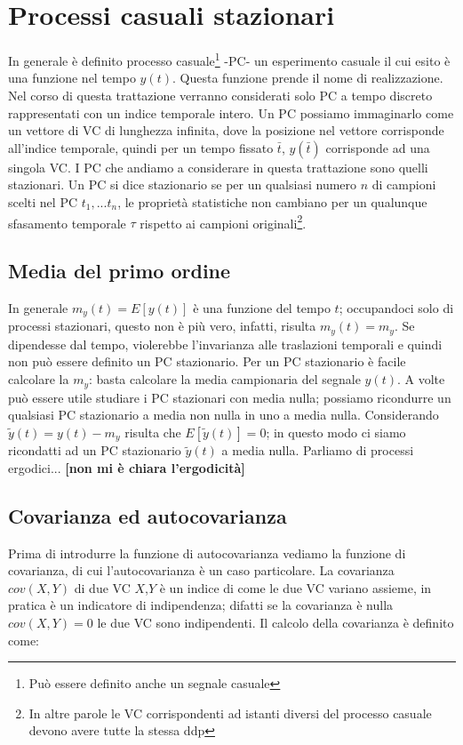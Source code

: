 \section{Processi casuali stazionari}
In generale è definito processo casuale\footnote{Può essere definito anche un segnale casuale} -PC- un esperimento casuale il cui esito è una funzione nel tempo $y(t)$. Questa funzione prende il nome di realizzazione. Nel corso di questa trattazione verranno considerati solo PC a tempo discreto rappresentati con un indice temporale intero.\newline
Un PC possiamo immaginarlo come un vettore di VC di lunghezza infinita, dove la posizione nel vettore corrisponde all'indice temporale, quindi per un tempo fissato $\bar{t}$, $y(\bar{t})$ corrisponde ad una singola VC. I PC che andiamo a considerare in questa trattazione sono quelli stazionari. Un PC si dice stazionario se per un qualsiasi numero $n$ di campioni scelti nel PC $t_1, ...t_n$, le proprietà statistiche non cambiano per un qualunque sfasamento temporale $\tau$ rispetto ai campioni originali\footnote{In altre parole le VC corrispondenti ad istanti diversi del processo casuale devono avere tutte la stessa ddp}.

\subsection{Media del primo ordine}
In generale $m_y(t)=E[y(t)]$ è una funzione del tempo $t$; occupandoci solo di processi stazionari, questo non è più vero, infatti, risulta $m_y(t)=m_y$. Se dipendesse dal tempo, violerebbe l'invarianza alle traslazioni temporali e quindi non può essere definito un PC stazionario.\newline
Per un PC stazionario è facile calcolare la $m_y$: basta calcolare la media campionaria del segnale $y(t)$.\newline 
A volte può essere utile studiare i PC stazionari con media nulla; possiamo ricondurre un qualsiasi PC stazionario a media non nulla in uno a media nulla. Considerando $\tilde{y}(t)=y(t)-m_y$ risulta che $E[\tilde{y}(t)]=0$; in questo modo ci siamo ricondatti ad un PC stazionario $\tilde{y}(t)$ a media nulla.\newline
Parliamo di processi ergodici... \textbf{[non mi è chiara l'ergodicità]}
\subsection{Covarianza ed autocovarianza}
Prima di introdurre la funzione di autocovarianza vediamo la funzione di covarianza, di cui l'autocovarianza è un caso particolare. La covarianza $cov(X,Y)$ di due VC $X$,$Y$ è un indice di come le due VC variano assieme, in pratica è un indicatore di indipendenza; difatti se la covarianza è nulla $cov(X,Y)=0$ le due VC sono indipendenti. Il calcolo della covarianza è definito come:

